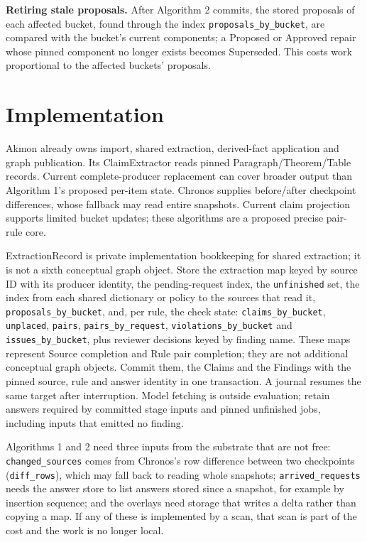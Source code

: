 \documentclass[11pt]{article}
\newcommand{\code}[1]{\texttt{#1}}
\begin{document}
\textbf{Retiring stale proposals.} After Algorithm 2 commits, the stored
proposals of each affected bucket, found through the index
\code{proposals\_by\_bucket}, are compared with the bucket's current
components; a Proposed or Approved repair whose pinned
component no longer exists becomes Superseded. This costs work proportional to
the affected buckets' proposals.

\section{Implementation}

Akmon already owns import, shared extraction, derived-fact application and graph
publication. Its ClaimExtractor reads pinned Paragraph/Theorem/Table records.
Current complete-producer replacement can cover broader output than Algorithm
1's proposed per-item state. Chronos supplies before/after checkpoint differences,
whose fallback may read entire snapshots. Current claim projection supports
limited bucket updates; these algorithms are a proposed precise pair-rule core.

ExtractionRecord is private implementation bookkeeping for shared extraction;
it is not a sixth conceptual graph object. Store the extraction map keyed by
source ID with its producer identity, the pending-request index, the
\code{unfinished} set, the index from each shared dictionary or policy to the
sources that read it, \code{proposals\_by\_bucket}, and, per
rule, the check state: \code{claims\_by\_bucket}, \code{unplaced},
\code{pairs}, \code{pairs\_by\_request}, \code{violations\_by\_bucket} and
\code{issues\_by\_bucket}, plus reviewer decisions keyed by finding name. These
maps represent Source completion and Rule pair completion; they are not additional
conceptual graph objects. Commit them, the Claims and the Findings with the
pinned source, rule and answer identity in one transaction. A journal resumes the
same target after interruption. Model fetching is outside evaluation; retain
answers required by committed stage inputs and pinned unfinished jobs,
including inputs that emitted no finding.

Algorithms 1 and 2 need three inputs from the substrate that are not free:
\code{changed\_sources} comes from Chronos's row difference between two
checkpoints (\code{diff\_rows}), which may fall back to reading whole snapshots;
\code{arrived\_requests} needs the answer store to list answers stored since a
snapshot, for example by insertion sequence; and the overlays need storage that
writes a delta rather than copying a map. If any of these is implemented by a
scan, that scan is part of the cost and the work is no longer local.
\end{document}
